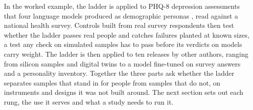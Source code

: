 In the worked example, the ladder is applied to PHQ-8 depression assessments that four language models produced as demographic personas \citep{keough2026plausible}, read against a national health survey.
Controls built from real survey respondents then test whether the ladder passes real people and catches failures planted at known sizes, a test any check on simulated samples has to pass before its verdicts on models carry weight.
The ladder is then applied to ten releases by other authors, ranging from silicon samples and digital twins to a model fine-tuned on survey answers \citep{suh2025subpop} and a personality inventory.
Together the three parts ask whether the ladder separates samples that stand in for people from samples that do not, on instruments and designs it was not built around.
The next section sets out each rung, the use it serves and what a study needs to run it.
